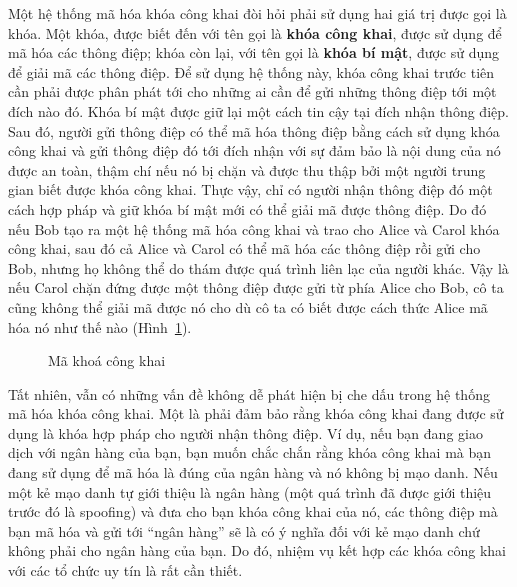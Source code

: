 Một hệ thống mã hóa khóa công khai đòi hỏi phải sử dụng hai giá trị được gọi là khóa. Một
khóa, được biết đến với tên gọi là \textbf{khóa công khai}, được sử dụng để mã hóa các
thông điệp; khóa còn lại, với tên gọi là \textbf{khóa bí mật}, được sử dụng để giải mã các
thông điệp. Để sử dụng hệ thống này, khóa công khai trước tiên cần phải được phân phát tới
cho những ai cần để gửi những thông điệp tới một đích nào đó. Khóa bí mật được giữ lại một
cách tin cậy tại đích nhận thông điệp. Sau đó, người gửi thông điệp có thể mã hóa thông
điệp bằng cách sử dụng khóa công khai và gửi thông điệp đó tới đích nhận với sự đảm bảo là
nội dung của nó được an toàn, thậm chí nếu nó bị chặn và được thu thập bởi một người trung
gian biết được khóa công khai. Thực vậy, chỉ có người nhận thông điệp đó một cách hợp pháp
và giữ khóa bí mật mới có thể giải mã được thông điệp. Do đó nếu Bob tạo ra một hệ thống
mã hóa công khai và trao cho Alice và Carol khóa công khai, sau đó cả Alice và Carol có
thể mã hóa các thông điệp rồi gửi cho Bob, nhưng họ không thể do thám được quá trình liên
lạc của người khác. Vậy là nếu Carol chặn đứng được một thông điệp được gửi từ phía Alice
cho Bob, cô ta cũng không thể giải mã được nó cho dù cô ta có biết được cách thức Alice mã
hóa nó như thế nào (Hình~\ref{fig:fig4.16}).
\begin{figure}[tbh] 
  \centering {}
  \caption{Mã khoá công khai}
  \label{fig:fig4.16}
\end{figure}

Tất nhiên, vẫn có những vấn đề không dễ phát hiện bị che dấu trong hệ thống mã hóa khóa
công khai. Một là phải đảm bảo rằng khóa công khai đang được sử dụng là khóa hợp pháp cho
người nhận thông điệp. Ví dụ, nếu bạn đang giao dịch với ngân hàng của bạn, bạn muốn chắc
chắn rằng khóa công khai mà bạn đang sử dụng để mã hóa là đúng của ngân hàng và nó không
bị mạo danh. Nếu một kẻ mạo danh tự giới thiệu là ngân hàng (một quá trình đã được giới
thiệu trước đó là spoofing) và đưa cho bạn khóa công khai của nó, các thông điệp mà bạn mã
hóa và gửi tới ``ngân hàng'' sẽ là có ý nghĩa đối với kẻ mạo danh chứ không phải cho ngân
hàng của bạn. Do đó, nhiệm vụ kết hợp các khóa công khai với các tổ chức uy tín là rất cần
thiết.

